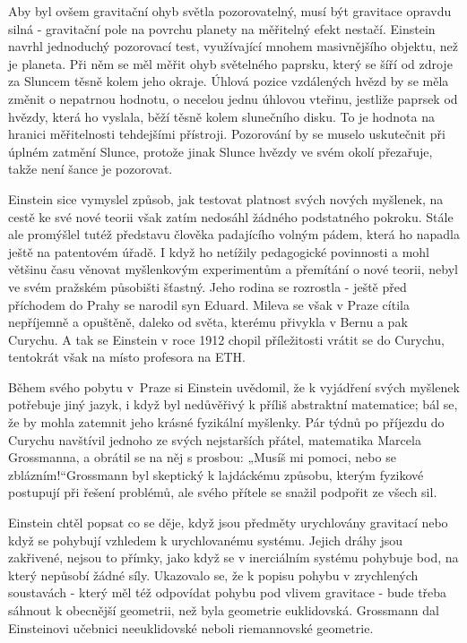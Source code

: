   Aby byl ovšem gravitační ohyb světla pozorovatelný, musí být gravitace opravdu silná - gravitační
  pole na povrchu planety na měřitelný efekt nestačí. Einstein navrhl jednoduchý pozorovací test,
  využívající mnohem masivnějšího objektu, než je planeta. Při něm se měl měřit ohyb světelného
  paprsku, který se šíří od zdroje za Sluncem těsně kolem jeho okraje. Úhlová pozice vzdálených
  hvězd by se měla změnit o nepatrnou hodnotu, o necelou jednu úhlovou vteřinu, jestliže paprsek od
  hvězdy, která ho vyslala, běží těsně kolem slunečního disku. To je hodnota na hranici měřitelnosti
  tehdejšími přístroji. Pozorování by se muselo uskutečnit při úplném zatmění Slunce, protože jinak
  Slunce hvězdy ve svém okolí přezařuje, takže není šance je pozorovat. 
  
  Einstein sice vymyslel způsob, jak testovat platnost svých nových myšlenek, na cestě ke své nové
  teorii však zatím nedosáhl žádného podstatného pokroku. Stále ale promýšlel tutéž představu
  člověka padajícího volným pádem, která ho napadla ještě na patentovém úřadě. I když ho netížily
  pedagogické povinnosti a mohl většinu času věnovat myšlenkovým experimentům a přemítání o nové
  teorii, nebyl ve svém pražském působišti šťastný. Jeho rodina se rozrostla - ještě před příchodem
  do Prahy se narodil syn Eduard. Mileva se však v Praze cítila nepříjemně a opuštěně, daleko od
  světa, kterému přivykla v Bernu a pak Curychu. A tak se Einstein v roce 1912 chopil příležitosti
  vrátit se do Curychu, tentokrát však na místo profesora na ETH. 
  
  Během svého pobytu v Praze si Einstein uvědomil, že k vyjádření svých myšlenek potřebuje jiný
  jazyk, i když byl nedůvěřivý k příliš abstraktní matematice; bál se, že by mohla zatemnit jeho
  krásné fyzikální myšlenky. Pár týdnů po příjezdu do Curychu navštívil jednoho ze svých nejstarších
  přátel, matematika Marcela Grossmanna, a obrátil se na něj s prosbou: „Musíš mi pomoci, nebo se
  zblázním!“Grossmann byl skeptický k lajdáckému způsobu, kterým fyzikové postupují při řešení
  problémů, ale svého přítele se snažil podpořit ze všech sil. 
  
  Einstein chtěl popsat co se děje, když jsou předměty urychlovány gravitací nebo když se pohybují
  vzhledem k urychlovanému systému. Jejich dráhy jsou zakřivené, nejsou to přímky, jako když se v
  inerciálním systému pohybuje bod, na který nepůsobí žádné síly. Ukazovalo se, že k popisu pohybu v
  zrychlených soustavách - který měl též odpovídat pohybu pod vlivem gravitace - bude třeba sáhnout
  k obecnější geometrii, než byla geometrie euklidovská. Grossmann dal Einsteinovi učebnici
  neeuklidovské neboli riemannovské geometrie. 
  
